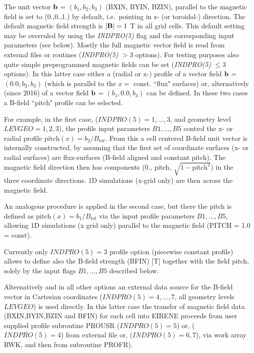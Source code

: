 
The unit vector  $\mathbf{b}$ = $( b_1, b_2, b_3 )$ (BXIN, BYIN, BZIN), parallel to
the magnetic field is set to (0.,0.,1.) by default, i.e.\ pointing in z- (or 
toroidal-) direction.
The default magnetic field strength is $|\mathbf{B}|=1$ T in all grid cells.
This default setting may be overruled by using the \emph{INDPRO(5)} flag and
the corresponding input parameters (see below).
Mostly the full magnetic vector field is read from external files or routines
(\emph{INDPRO(5)} $> 3$ options).
For testing purposes also quite simple preprogrammed magnetic fields can be set
(\emph{INDPRO(5)} $\leq 3$ options).
In this latter case either a (radial or x-) profile of a vector field $\mathbf{b}$ =
$( 0.0, b_2, b_3 )$ (which is parallel to the $x=$ const.
``flux" surfaces) or, alternatively (since 2016) of a vector field $\mathbf{b}$ = $(
  b_1, 0.0, b_3 )$ can be defined.
In these two cases a B-field ``pitch"  profile can be selected.

For example, in the first case, ($INDPRO(5) = 1, \dots, 3$, and geometry level
$LEVGEO=1,2,3$), the profile input parameters $B1, \dots, B5$  control the x-
or radial profile $\mathrm{pitch}(x) = b_2/B_{tot}$.
From this a cell centered B-field unit vector is internally constructed, by
assuming that the first set of coordinate surfaces (x- or radial surfaces) are
flux-surfaces (B-field aligned and constant pitch).
The magnetic field direction then has components ($0.
$, pitch, $\sqrt{1-\mathrm{pitch}^2}$) in the three coordinate directions.
1D simulations (x-grid only) are then across the magnetic field.

An analogous procedure is applied in the second case, but there the pitch is
defined as $\mathrm{pitch}(x) = b_1/B_{tot}$ via the input profile parameters
$B1, \dots, B5$, allowing 1D simulations (x grid only) parallel to the magnetic
field (PITCH = 1.0 = const).

Currently only $INDPRO(5)=3$ profile option (piecewise constant profile) allows
to define also the B-field strength (BFIN) [T] together with the field pitch,
solely by the input flags $B1, \dots, B5$ described below.

Alternatively and in all other options an external data source for the B-field
vector in Cartesian coordinates ($INDPRO(5) = 4, \dots, 7$, all geometry levels
$LEVGEO$) is used directly.
In this latter case the transfer of magnetic field data (BXIN,BYIN,BZIN and
BFIN) for each cell into EIRENE proceeds from user supplied profile subroutine
PROUSR ($INDPRO(5)=5$) or, ($INDPRO(5)=4$) from external file or,
($INDPRO(5)=6,7$), via work array RWK, and then from subroutine PROFR).

